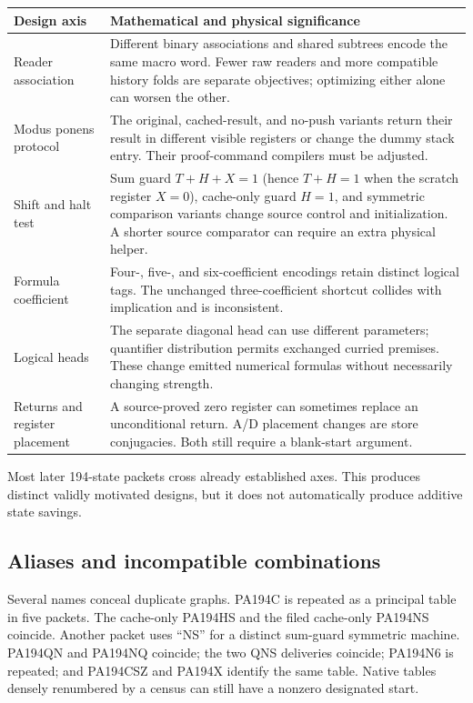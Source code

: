 \documentclass[11pt]{article}
\begin{document}
\begingroup\small
\begin{longtable}{p{.23\linewidth}p{.69\linewidth}}
\toprule
Design axis & Mathematical and physical significance\\
\midrule\endhead
Reader association & Different binary associations and shared subtrees encode the same macro word. Fewer raw readers and more compatible history folds are separate objectives; optimizing either alone can worsen the other.\\[3pt]
Modus ponens protocol & The original, cached-result, and no-push variants return their result in different visible registers or change the dummy stack entry. Their proof-command compilers must be adjusted.\\[3pt]
Shift and halt test & Sum guard $T+H+X=1$ (hence $T+H=1$ when the scratch register $X=0$), cache-only guard $H=1$, and symmetric comparison variants change source control and initialization. A shorter source comparator can require an extra physical helper.\\[3pt]
Formula coefficient & Four-, five-, and six-coefficient encodings retain distinct logical tags. The unchanged three-coefficient shortcut collides with implication and is inconsistent.\\[3pt]
Logical heads & The separate diagonal head can use different parameters; quantifier distribution permits exchanged curried premises. These change emitted numerical formulas without necessarily changing strength.\\[3pt]
Returns and register placement & A source-proved zero register can sometimes replace an unconditional return. A/D placement changes are store conjugacies. Both still require a blank-start argument.\\
\bottomrule
\end{longtable}
\endgroup
Most later 194-state packets cross already established axes. This produces distinct validly motivated designs, but it does not automatically produce additive state savings.

\subsection{Aliases and incompatible combinations}
Several names conceal duplicate graphs. PA194C is repeated as a principal table in five packets. The cache-only PA194HS and the filed cache-only PA194NS coincide. Another packet uses ``NS'' for a distinct sum-guard symmetric machine. PA194QN and PA194NQ coincide; the two QNS deliveries coincide; PA194N6 is repeated; and PA194CSZ and PA194X identify the same table. Native tables densely renumbered by a census can still have a nonzero designated start.
\end{document}
